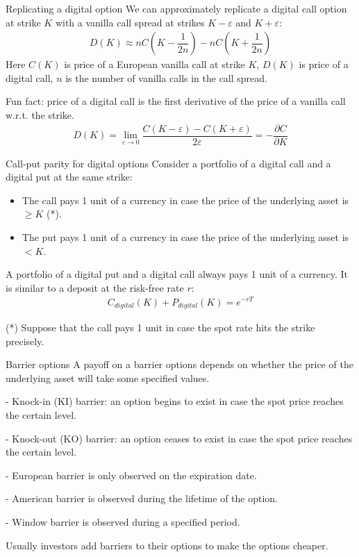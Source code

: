 \documentclass{beamer}
\begin{document}
\begin{frame}{Replicating a digital option}
\justify
We can approximately replicate a digital call option at strike $K$ with a vanilla call spread at strikes $K-\varepsilon$ and $K+\varepsilon$:
\begin{align*}
D(K) \approx nC\left(K - \dfrac{1}{2n}\right) - nC\left(K + \dfrac{1}{2n}\right)
\end{align*}
Here $C(K)$ is price of a European vanilla call at strike $K$, $D(K)$ is price of a digital call, $n$ is the number of vanilla calls in the call spread.

\justify
Fun fact: price of a digital call is the first derivative of the price of a vanilla call w.r.t. the strike.
\begin{align*}
D(K) = \lim\limits_{\varepsilon\to 0}\dfrac{C(K-\varepsilon) - C(K+\varepsilon)}{2\varepsilon} = -\dfrac{\partial C}{\partial K}
\end{align*}
\end{frame}



\begin{frame}{Call-put parity for digital options}
\justify
Consider a portfolio of a digital call and a digital put at the same strike:

\justify
\begin{itemize}
\justifying
\item The call pays 1 unit of a currency in case the price of the underlying asset is $\ge K$ (*).
\item The put pays 1 unit of a currency in case the price of the underlying asset is $< K$.
\end{itemize}

\justify
A portfolio of a digital put and a digital call always pays 1 unit of a currency. It is similar to a deposit at the risk-free rate $r$:
\begin{align*}
C_{digital}(K) + P_{digital}(K) = e^{-rT}
\end{align*}

\justify
(*) Suppose that the call pays 1 unit in case the spot rate hits the strike precisely.
\end{frame}



\begin{frame}{Barrier options}
\justify
A payoff on a \alert{barrier options} depends on whether the price of the underlying asset will take some specified values.

\justify
- \alert{Knock-in (KI)} barrier: an option begins to exist in case the spot price reaches the certain level.

- \alert{Knock-out (KO)} barrier: an option ceases to exist in case the spot price reaches the certain level.

\justify
- European barrier is only observed on the expiration date.

- American barrier is observed during the lifetime of the option.

- Window barrier is observed during a specified period.

\justify
Usually investors add barriers to their options to make the options cheaper.
\end{frame}
\end{document}
